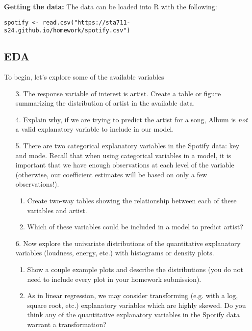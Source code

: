 \documentclass[11pt]{article}
\begin{document}
\noindent \textbf{Getting the data:} The data can be loaded into R with the following:

\begin{verbatim}
spotify <- read.csv("https://sta711-s24.github.io/homework/spotify.csv")
\end{verbatim}

\subsection*{EDA}

To begin, let's explore some of the available variables

\begin{enumerate}

\item[3.] The response variable of interest is artist. Create a table or figure summarizing the distribution of artist in the available data.

\item[4.] Explain why, if we are trying to predict the artist for a song, Album is \textit{not} a valid explanatory variable to include in our model.

\item[5.] There are two categorical explanatory variables in the Spotify data: key and mode. Recall that when using categorical variables in a model, it is important that we have enough observations at each level of the variable (otherwise, our coefficient estimates will be based on only a few observations!).

\begin{enumerate}
\item Create two-way tables showing the relationship between each of these variables and artist.

\item Which of these variables could be included in a model to predict artist?
\end{enumerate}

\item[6.] Now explore the univariate distributions of the quantitative explanatory variables (loudness, energy, etc.) with histograms or density plots.

\begin{enumerate}
\item Show a couple example plots and describe the distributions (you do not need to include every plot in your homework submission).

\item As in linear regression, we may consider transforming (e.g. with a log, square root, etc.) explanatory variables which are highly skewed. Do you think any of the quantitative explanatory variables in the Spotify data warrant a transformation?
\end{enumerate}


\end{enumerate}
\end{document}
